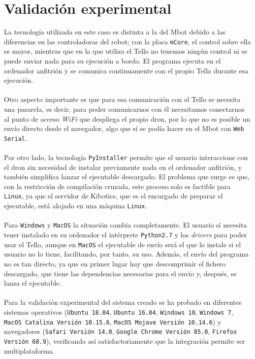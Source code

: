 \documentclass{report}
\begin{document}
\section{Validación experimental}

La tecnología utilizada en este caso es distinta a la del Mbot debido a las diferencias en las controladoras del robot; con la placa \texttt{mCore}, el control sobre ella es mayor, mientras que en la que utiliza el Tello no tenemos ningún control ni se puede enviar nada para su ejecución a bordo. El programa ejecuta en el ordenador anfitrión y se comunica continuamente con el propio Tello durante esa ejecución.
\\
\\
Otro aspecto importante es que para esa comunicación con el Tello se necesita una pasarela, es decir, para poder comunicarnos con él necesitamos conectarnos al punto de acceso \textit{WiFi} que despliega el propio dron, por lo que no es posible un envío directo desde el navegador, algo que sí se podía hacer en el Mbot con \texttt{Web Serial}.
\\
\\
Por otro lado, la tecnología \texttt{PyInstaller} permite que el usuario interaccione con el dron sin necesidad de instalar previamente nada en el ordenador anfitrión, y también simplifica lanzar el ejecutable descargado. El problema que surge es que, con la restricción de compilación cruzada, este proceso solo es factible para \texttt{Linux}, ya que el servidor de Kibotics, que es el encargado de preparar el ejecutable, está alojado en una máquina \texttt{Linux}.
\\
\\
Para \texttt{Windows} y \texttt{MacOS} la situación cambia completamente. El usuario sí necesita tener instalado en su ordenador el intérprete \texttt{Python2.7} y los \textit{drivers} para poder usar el Tello, aunque en \texttt{MacOS} el ejecutable de envío será el que lo instale si el usuario no lo tiene, facilitando, por tanto, su uso. Además, el envío del programa no es tan directo, ya que en primer lugar hay que descomprimir el fichero descargado, que tiene las dependencias necesarias para el envío y, después, se lanza el ejecutable.
\\ 
\\
Para la validación experimental del sistema creado se ha probado en diferentes sistemas operativos (\texttt{Ubuntu 18.04}, \texttt{Ubuntu 16.04}, \texttt{Windows 10}, \texttt{Windows 7}, \texttt{MacOS Catalina Versión 10.15.6}, \texttt{MacOS Mojave Versión 10.14.6}) y navegadores (\texttt{Safari Versión 14.0}, \texttt{Google Chrome Versión 85.0}, \texttt{Firefox Versión 68.9}), verificando así satisfactoriamente que la integración permite ser multiplataforma.
\end{document}
